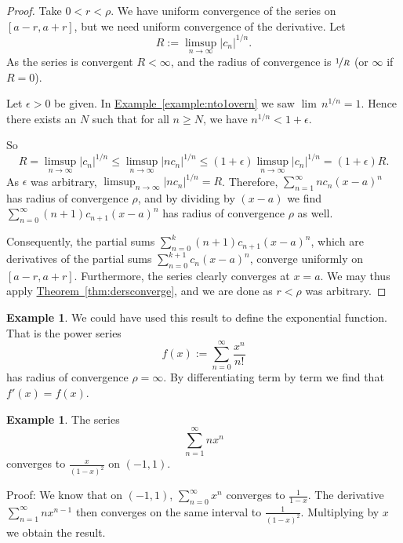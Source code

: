 \documentclass[12pt]{book}
\newcommand{\abs}[1]{\left\lvert {#1} \right\rvert}
\theoremstyle{plain}
\theoremstyle{remark}
\theoremstyle{definition}
\theoremstyle{exercise}
\theoremstyle{example}
\newtheorem{example}[thm]{Example}
\newcommand{\exampleref}[1]{\hyperref[#1]{Example~\ref*{#1}}}
\newcommand{\thmref}[1]{\hyperref[#1]{Theorem~\ref*{#1}}}
\begin{document}
\begin{proof}
Take $0 < r < \rho$.
We have uniform convergence of the series on $[a-r,a+r]$,
but we need uniform convergence of the derivative.
Let
\begin{equation*}
R := \limsup_{n \to \infty} \abs{c_n}^{1/n} .
\end{equation*}
As the series is convergent $R < \infty$, and
the radius of convergence is $\nicefrac{1}{R}$ (or $\infty$ if $R=0$).

Let $\epsilon > 0$ be given.  In \exampleref{example:nto1overn} 
we saw $\lim\,n^{1/n} = 1$.
Hence there exists an $N$ such that for all $n \geq N$, we have
$n^{1/n} < 1+\epsilon$.

So
\begin{equation*}
R = 
\limsup_{n \to \infty}
\abs{c_n}^{1/n}
\leq
\limsup_{n \to \infty}
\abs{n c_n}^{1/n}
\leq
(1+\epsilon)
\limsup_{n \to \infty}
\abs{c_n}^{1/n}
=
(1+\epsilon)R .
\end{equation*}
As $\epsilon$ was arbitrary, $\limsup_{n \to \infty} \abs{n c_n}^{1/n} = R$.
Therefore, $\sum_{n=1}^\infty n c_{n} {(x-a)}^{n}$ has radius of
convergence $\rho$, and by dividing by $(x-a)$ we find
$\sum_{n=0}^\infty (n+1) c_{n+1} {(x-a)}^{n}$ has radius of convergence
$\rho$ as well.

Consequently, the partial sums 
$\sum_{n=0}^k (n+1) c_{n+1} {(x-a)}^{n}$,
which are derivatives of the partial sums
$\sum_{n=0}^{k+1} c_{n} {(x-a)}^{n}$,
converge uniformly on $[a-r,a+r]$.  Furthermore,
the series clearly converges at $x=a$.
We may thus apply \thmref{thm:dersconverge}, and
we are done as $r < \rho$ was arbitrary.
\end{proof}

\begin{example}
We could have used this result to define the exponential function.  That is
the power series
\begin{equation*}
f(x) := \sum_{n=0}^\infty \frac{x^n}{n!}
\end{equation*}
has radius of convergence $\rho=\infty$.  By differentiating
term by term we find that $f'(x) = f(x)$.
\end{example}

\begin{example}
The series
\begin{equation*}
\sum_{n=1}^\infty n x^n
\end{equation*}
converges to $\frac{x}{{(1-x)}^2}$ on $(-1,1)$.

Proof:
We know that on $(-1,1)$, $\sum_{n=0}^\infty x^n$ converges to
$\frac{1}{1-x}$.  The derivative $\sum_{n=1}^\infty n x^{n-1}$ then converges
on the same interval to $\frac{1}{{(1-x)}^2}$.  Multiplying by $x$
we obtain the result.
\end{example}
\end{document}
